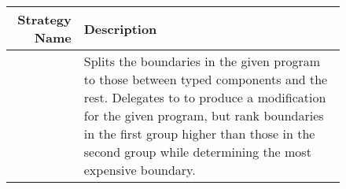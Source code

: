 \begin{figure}[htb]
 
  \newcommand{\desc}[1]{\parbox[t]{21.5em}{#1}}

 
  \def\desca{\desc{Splits the boundaries in the given program to those
  between typed components and the rest.  Delegates to \featopt{} to
  produce a modification for the given program, but rank boundaries  
  in the first group higher than those in the second group while
  determining the most expensive boundary.}}

   \def\descb{\desc{Same as \featcostopt{} except that it delegates 
   to \featcon{}.}}

   \def\descc{\desc{Separates the typed components   that have boundaries
   with other typed components from the rest of the components in the
   given program. Delegates to \statselfopt{} to produce a modification
   for the given program,  but rank boundaries between components  
  in the first group higher than the rest while
  determining the most expensive boundary.}}

   \def\descd{\desc{Same as \statselfcostopt{} except that it delegates 
   to \stattotalopt{}.}}

   \def\desce{\desc{Same as \statselfcostopt{} except that it delegates 
   to \statselfcon{}.}}

   \def\descf{\desc{Same as \statselfcostopt{} except that it delegates 
   to \stattotalcon{}.}}

   \def\descg{\desc{If the number of typed components in the given program 
   is above a threshold $N$, it delegates to \featopt{}. Otherwise, it
   delegates to \featcon{}.}}

    \def\desch{\desc{Same as \featconf{} except that it delegates 
   to \statselfopt{} or \statselfcon{}.}}

    \def\descj{\desc{Same as \featconf{} except that it delegates 
   to \stattotalopt{} or \stattotalcon{}.}}



 \begin{tabular}{r|l}
    {\bf Strategy Name} & {\bf Description} \\\hline
    \featcostopt{}      &   \desca           \\\hline
    \featcostcon{}      &   \descb           \\\hline
  

\end{tabular}
\end{figure}
